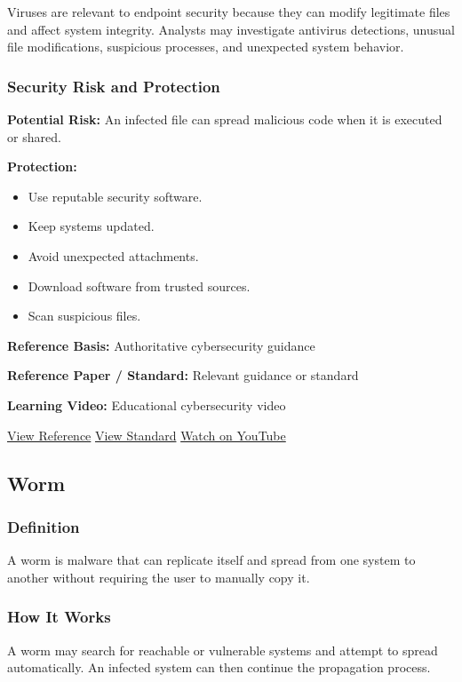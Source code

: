 \documentclass[12pt,a4paper]{article}
\newcommand{\refs}[3]{%
    \textbf{Reference Basis:} Authoritative cybersecurity guidance\par
    \textbf{Reference Paper / Standard:} Relevant guidance or standard\par
    \textbf{Learning Video:} Educational cybersecurity video\par
    \href{#1}{\textcolor{linkblue}{View Reference}}
    \quad
    \href{#2}{\textcolor{linkblue}{View Standard}}
    \quad
    \href{#3}{\textcolor{linkblue}{Watch on YouTube}}
}
\begin{document}
Viruses are relevant to endpoint security because they can modify legitimate files and affect system integrity. Analysts may investigate antivirus detections, unusual file modifications, suspicious processes, and unexpected system behavior.

\subsubsection{Security Risk and Protection}

\textbf{Potential Risk:} An infected file can spread malicious code when it is executed or shared.

\textbf{Protection:}

\begin{itemize}
    \item Use reputable security software.
    \item Keep systems updated.
    \item Avoid unexpected attachments.
    \item Download software from trusted sources.
    \item Scan suspicious files.
\end{itemize}

\refs
{https://www.cisa.gov/news-events/news/malware}
{https://www.cisa.gov/news-events/news/malware}
{https://www.youtube.com/results?search_query=Professor+Messer+malware+virus}


\subsection{Worm}

\subsubsection{Definition}

A worm is malware that can replicate itself and spread from one system to another without requiring the user to manually copy it.

\subsubsection{How It Works}

A worm may search for reachable or vulnerable systems and attempt to spread automatically. An infected system can then continue the propagation process.
\end{document}
